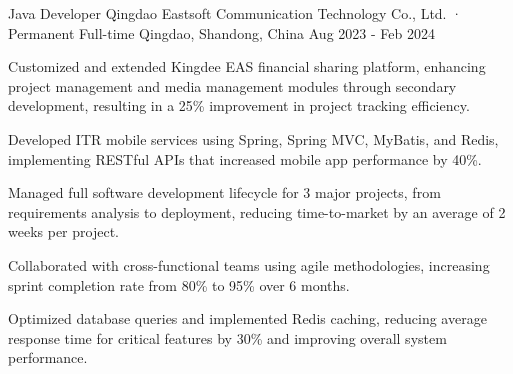 \begin{cventries}
  \cventry
  {Java Developer} %
  {Qingdao Eastsoft Communication Technology Co., Ltd. · Permanent Full-time} %
  {Qingdao, Shandong, China} %
  {Aug 2023 - Feb 2024} %
  {
    \begin{cvitems} %
      \item {Customized and extended Kingdee EAS financial sharing platform, enhancing project management and media management modules through secondary development, resulting in a 25\% improvement in project tracking efficiency.}
      \item {Developed ITR mobile services using Spring, Spring MVC, MyBatis, and Redis, implementing RESTful APIs that increased mobile app performance by 40\%.}
      \item {Managed full software development lifecycle for 3 major projects, from requirements analysis to deployment, reducing time-to-market by an average of 2 weeks per project.}
      \item {Collaborated with cross-functional teams using agile methodologies, increasing sprint completion rate from 80\% to 95\% over 6 months.}
      \item {Optimized database queries and implemented Redis caching, reducing average response time for critical features by 30\% and improving overall system performance.}
    \end{cvitems}
  }

  \vspace{5mm}


\end{cventries}
